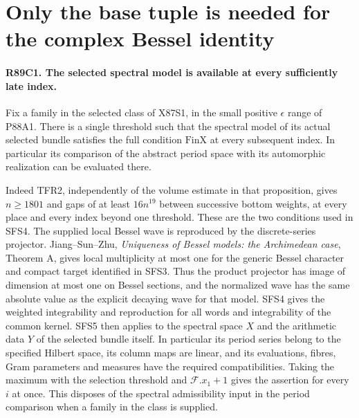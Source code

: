 \section{Only the base tuple is needed for the complex Bessel identity}

\paragraph{R89C1. The selected spectral model is available at every sufficiently late index.}
Fix a family in the selected class of X87S1, in the small positive
$\epsilon$ range of P88A1. There is a single threshold such that the
spectral model of its actual selected bundle satisfies the full
condition $\mathrm{FinX}$ at every subsequent index. In particular its
comparison of the abstract period space with its automorphic realization
can be evaluated there.

Indeed TFR2, independently of the volume estimate in that proposition,
gives $n\ge1801$ and gaps of at least $16n^{19}$ between successive
bottom weights, at every place and every index beyond one threshold.
These are the two conditions used in SFS4. The supplied local Bessel
wave is reproduced by the discrete-series projector. Jiang--Sun--Zhu,
\emph{Uniqueness of Bessel models: the Archimedean case}, Theorem A,
gives local multiplicity at most one for the generic Bessel character
and compact target identified in SFS3. Thus the product projector
has image of dimension at most one on Bessel sections, and the normalized wave has
the same absolute value as the explicit decaying wave for that model.
SFS4 gives the weighted integrability and reproduction for all words
and integrability of the common kernel. SFS5 then applies to the
spectral space $X$ and the arithmetic data $Y$ of the selected
bundle itself. In particular its period series belong to the specified
Hilbert space, its column maps are linear, and its evaluations,
fibres, Gram parameters and measures have the required compatibilities.
Taking the maximum with the selection threshold and
$\mathcal F.x_1+1$ gives the assertion for every $i$ at once.
This disposes of the spectral admissibility input in the period
comparison when a family in the class is supplied.

